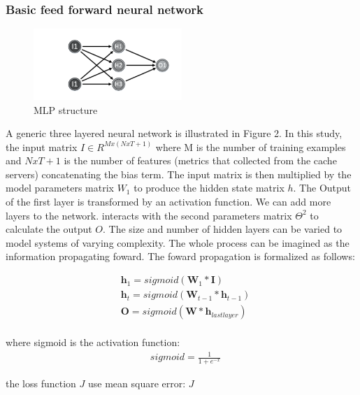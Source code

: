 \documentclass[5p]{elsarticle}
\begin{document}
\subsubsection{Basic feed forward neural network}
\begin{figure}[h]
    \centering
    \includegraphics[width=0.5\textwidth]{mlp.png}
    \caption{MLP structure}
    \label{fig:RNN}
\end{figure}

A generic three layered neural network is illustrated in Figure 2. In this study, the input matrix $I \in R^{Mx(NxT+1)}$  where M is the number of training examples and $NxT+1$ is the number of features (metrics that collected from the cache servers) concatenating the bias term. The input matrix is then multiplied by the model parameters matrix $W_1$ to produce the hidden state matrix $h$. The Output of the first layer is transformed by an activation function. We can add more layers to the network. interacts with the second parameters matrix $\Theta^2$ to calculate the output $O$. The size and number of hidden layers can be varied to model systems of varying complexity. The whole process can be imagined as the information propagating foward. The foward propagation is formalized as follows:

\begin{equation}
    \begin{split}
    & \mathbf h_1 = sigmoid(\mathbf W_1 * \mathbf I) \\
    & \mathbf h_t = sigmoid(\mathbf W_{t-1} * \mathbf h_{t-1}) \\
    & \mathbf O=sigmoid(\mathbf W * \mathbf h_{lastlayer}) \\
    \end{split}
\end{equation}

where sigmoid is the activation function:
\begin{equation}
    \begin{split}
    & sigmoid=\frac{1}{1+e^{-x}}
    \end{split}
\end{equation}

the loss function $J$ use mean square error:
    $J$
\end{document}
